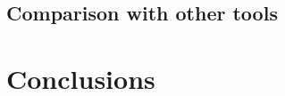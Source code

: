 \subsection{Comparison with other tools}



\section{Conclusions}
\label{sec:information_conclusions}
